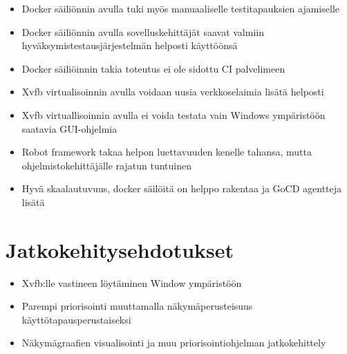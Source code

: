   \begin{itemize}
    \item Docker säiliönnin avulla tuki myös manuaaliselle testitapauksien ajamiselle
    \item Docker säiliönnin avulla sovelluskehittäjät saavat valmiin hyväksymistestausjärjestelmän helposti käyttöönsä
    \item Docker säiliöinnin takia toteutus ei ole sidottu CI palvelimeen
    \item Xvfb virtualisoinnin avulla voidaan uusia verkkoselaimia lisätä helposti
    \item Xvfb virtuallisoinnin avulla ei voida testata vain Windows ympäristöön saatavia GUI-ohjelmia
    \item Robot framework takaa helpon luettavuuden kenelle tahansa, mutta ohjelmistokehittäjälle rajatun tuntuinen
    \item Hyvä skaalautuvuus, docker säilöitä on helppo rakentaa ja GoCD agentteja lisätä
  \end{itemize}

\section{Jatkokehitysehdotukset} \label{ch:12_jatkokehitysehdotukset}

  \begin{itemize}
    \item Xvfb:lle vastineen löytäminen Window ympäristöön
    \item Parempi priorisointi muuttamalla näkymäperusteisuus käyttötapausperustaiseksi
    \item Näkymägraafien visualisointi ja muu priorisointiohjelman jatkokehittely
  \end{itemize}